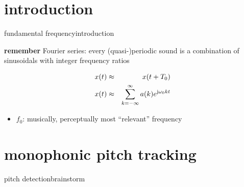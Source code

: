     \section[intro]{introduction}
	\begin{frame}{fundamental frequency}{introduction}
        \begin{block}{\textbf{remember}}
            Fourier series: every (quasi-)periodic sound is a combination of sinusoidals with integer frequency ratios
        \end{block}
        \begin{eqnarray*}
            x(t) 	&\approx& x(t+T_0)\nonumber\\
            x(t) &\approx& \sum\limits_{k=-\infty}^{\infty} a(k) {e}^{\mathrm{j}\omega_0kt}\nonumber
        \end{eqnarray*}
        
		\begin{itemize}
			\item<2->[]	$f_0$: musically, perceptually most ``relevant'' frequency
		\end{itemize}
	\end{frame}
	
    
    \section[time domain]{monophonic pitch tracking}
        \begin{frame}{pitch detection}{brainstorm}
        \end{frame}

